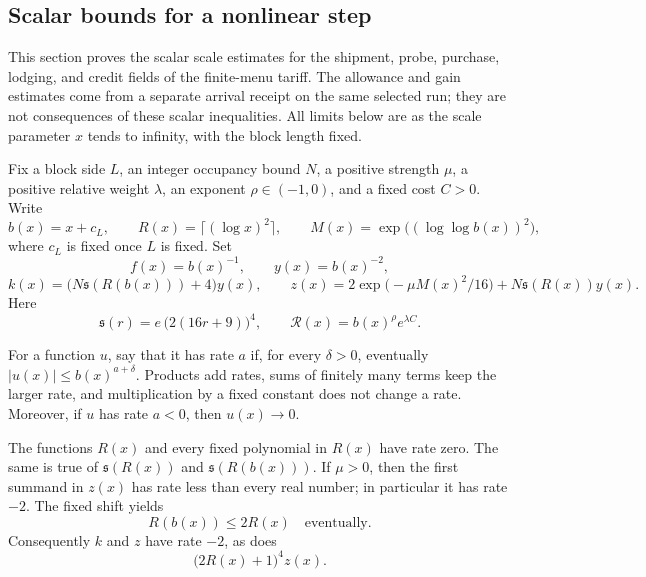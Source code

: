 \subsection{Scalar bounds for a nonlinear step}
\label{sec:ex-lattice-price-receipts}

This section proves the scalar scale estimates for the shipment, probe,
purchase, lodging, and credit fields of the finite-menu tariff. The allowance
and gain estimates come from a separate arrival receipt on the same selected
run; they are not consequences of these scalar inequalities. All limits below
are as the scale parameter $x$ tends to infinity, with the block length fixed.

Fix a block side $L$, an integer occupancy bound $N$, a positive strength
$\mu$, a positive relative weight $\lambda$, an exponent $\rho\in(-1,0)$,
and a fixed cost $C>0$. Write
\[
 b(x)=x+c_L,\qquad R(x)=\lceil(\log x)^2\rceil,\qquad
 M(x)=\exp\bigl((\log\log b(x))^2\bigr),
\]
where $c_L$ is fixed once $L$ is fixed. Set
\[
 f(x)=b(x)^{-1},\qquad y(x)=b(x)^{-2},
\]
\[
 k(x)=\bigl(N\mathfrak s(R(b(x)))+4\bigr)y(x),
 \qquad
 z(x)=2\exp\bigl(-\mu M(x)^2/16\bigr)
       +N\mathfrak s(R(x))y(x).
\]
Here
\[
 \mathfrak s(r)=e\,\bigl(2(16r+9)\bigr)^4,
 \qquad \mathcal R(x)=b(x)^\rho e^{\lambda C}.
\]

\begin{lemma}
\label{lem:ex-lattice-price-rate-calculus}
For a function $u$, say that it has rate $a$ if, for every $\delta>0$,
eventually $|u(x)|\leq b(x)^{a+\delta}$. Products add rates, sums of finitely
many terms keep the larger rate, and multiplication by a fixed constant does
not change a rate. Moreover, if $u$ has rate $a<0$, then $u(x)\to0$.

The functions $R(x)$ and every fixed polynomial in $R(x)$ have rate zero.
The same is true of $\mathfrak s(R(x))$ and $\mathfrak s(R(b(x)))$. If
$\mu>0$, then the first summand in $z(x)$ has rate less than
every real number; in particular it has rate $-2$. The fixed shift yields
\begin{equation}
 R(b(x))\leq 2R(x)\quad\text{eventually}.
 \label{eq:ex-lattice-pressure-radius}
\end{equation}
Consequently $k$ and $z$ have rate $-2$, as does
\[
\bigl(2R(x)+1\bigr)^4z(x).
 \]
\end{lemma}

